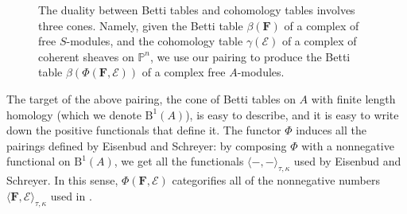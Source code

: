 \documentclass[12pt]{amsart}
\theoremstyle{definition}
\theoremstyle{remark}
\newcommand{\PP}{\mathbb{P}}
\newcommand{\cE}{\mathcal{E}}
\newcommand{\FF}{\mathbf{F}}
\newcommand{\CQ}{\mathrm{C}}
\newcommand{\BBQ}{\mathrm{B}}
\begin{document}
\begin{figure}
\caption{The duality between Betti tables and cohomology tables involves three cones.  Namely, given the Betti table $\beta(\FF)$ of a complex of free $S$-modules, and the cohomology table $\gamma(\cE)$ of a complex of coherent sheaves on $\PP^n$, we use our pairing to produce the Betti table $\beta(\Phi(\FF,\cE))$ of a complex free $A$-modules.
}
\label{fig:bracket}
\end{figure}

The target of the above pairing, the cone of Betti tables on $A$ with finite length homology (which we denote $\BBQ^1(A)$), is easy to describe, and it is easy to write down the positive functionals that define it.
The functor $\Phi$ induces all the pairings defined by Eisenbud and Schreyer: by composing $\Phi$ with a nonnegative functional on $\BBQ^1(A)$, we get all the functionals $\langle -,-\rangle_{\tau,\kappa}$ used by Eisenbud and Schreyer.  In this sense, $\Phi(\FF,\cE)$ categorifies all of the nonnegative numbers $\langle \FF, \cE\rangle_{\tau,\kappa}$ used in \cite{eis-schrey1}.
\end{document}
